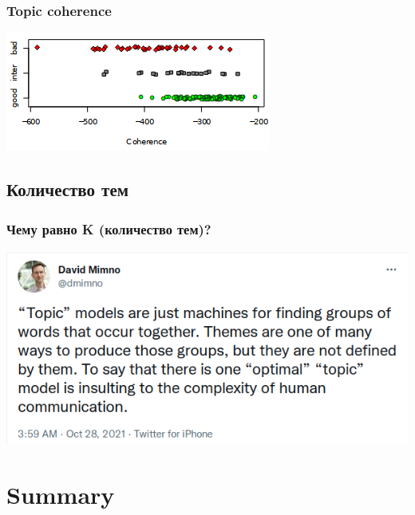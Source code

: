 \documentclass[10pt,svgnames]{beamer}
\begin{document}
\begin{frame}
  \frametitle{Topic coherence}
  \includegraphics[width=\textwidth]{coherence}
\end{frame}

\subsection{Количество тем}

\begin{frame}
  \frametitle{Чему равно K (количество тем)?}
  \includegraphics[width=\textwidth]{dmimno-on-tm}
\end{frame}


  \section{Summary}
\end{document}
